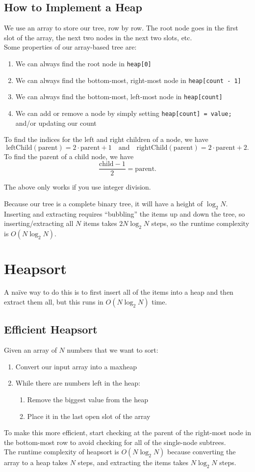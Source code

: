 \documentclass[class=article, crop=false]{standalone}
\begin{document}
  \subsection{How to Implement a Heap}
  We use an array to store our tree, row by row. The root node goes in the first slot of the array, the next two nodes in the next two slots, etc. \\[10pt]
  Some properties of our array-based tree are:
  \begin{enumerate}
    \item We can always find the root node in \texttt{heap[0]}
    \item We can always find the bottom-most, right-most node in \texttt{heap[count - 1]}
    \item We can always find the bottom-most, left-most node in \texttt{heap[count]}
    \item We can add or remove a node by simply setting \texttt{heap[count] = value;} and/or updating our count
  \end{enumerate}
  To find the indices for the left and right children of a node, we have
  \[
    \mathrm{leftChild}(\text{parent}) = 2\cdot \text{parent} + 1 \quad \text{and}\quad \mathrm{rightChild}(\text{parent}) = 2\cdot \text{parent} + 2.
  \]
  To find the parent of a child node, we have
  \[
    \frac{\text{child} - 1}{2} = \text{parent}.
  \]
  \begin{note}{}
    The above only works if you use integer division.
  \end{note}
  Because our tree is a complete binary tree, it will have a height of $\log_2N$. Inserting and extracting requires ``bubbling'' the items up and down the tree, so inserting/extracting all $N$ items takes $2N\log_2N$ steps, so the runtime complexity is $O(N\log_2N)$.
  \section{Heapsort}
  A na\"ive way to do this is to first insert all of the items into a heap and then extract them all, but this runs in $O(N\log_2N)$ time.
  \subsection{Efficient Heapsort}
  Given an array of $N$ numbers that we want to sort:
  \begin{enumerate}
    \item Convert our input array into a maxheap
    \item While there are numbers left in the heap:
    \begin{enumerate}[label=(\alph*)]
      \item Remove the biggest value from the heap
      \item Place it in the last open slot of the array
    \end{enumerate}
  \end{enumerate}
  To make this more efficient, start checking at the parent of the right-most node in the bottom-most row to avoid checking for all of the single-node subtrees. \\[10pt]
  The runtime complexity of heapsort is $O(N\log_2N)$ because converting the array to a heap takes $N$ steps, and extracting the items takes $N\log_2N$ steps.
\end{document}

